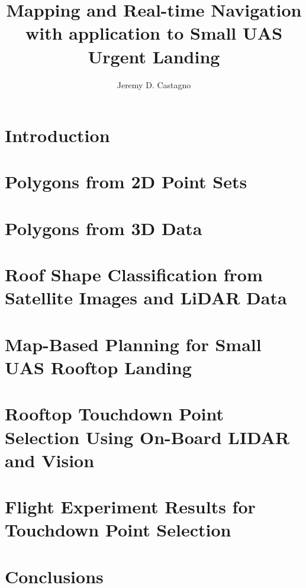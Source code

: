 \documentclass[thesis]{./style/thesis-umich}
\title{Mapping and Real-time Navigation \\ with application to Small UAS Urgent Landing}
\author{Jeremy D. Castagno}
\theoremstyle{remark}
\begin{document}

\chapter{Introduction}
 \label{ch:introduction}
 

 
\chapter{Polygons from 2D Point Sets}
 \label{ch:polylidar}
 
 
\chapter{Polygons from 3D Data}
 \label{ch:polylidar3d}
 
 
\chapter{Roof Shape Classification from Satellite Images and LiDAR Data}
 \label{ch:roofshape}
 
 
\chapter{Map-Based Planning for Small UAS Rooftop Landing}
 \label{ch:maplanding}
 
 
\chapter{Rooftop Touchdown Point Selection Using On-Board LIDAR and Vision}
 \label{ch:landingsim}
 
 
\chapter{Flight Experiment Results for Touchdown Point Selection}
 \label{ch:experiments}
 
 
\chapter{Conclusions}
 \label{ch:conclusions}
 


%  






\end{document}
